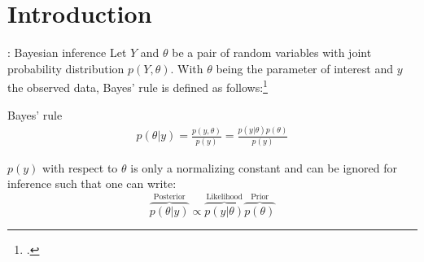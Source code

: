\section{Introduction}
\label{sec:intro}

\begin{frame}{: Bayesian inference}
    Let $Y$ and $\theta$ be a pair of random variables  with joint probability distribution $p(Y,\theta)$. With $\theta$ being the parameter of interest and $y$ the observed data, Bayes' rule is defined as follows:\footcite[pp.~6~f.]{gelman_bayesian_2013}

    \begin{block}{Bayes' rule}
        \begin{align}
            p(\theta|y) = \frac{p(y,\theta)}{p(y)} = \frac{p(y|\theta)p(\theta)}{p(y)}
        \end{align}
    \end{block}

    $p(y)$ with respect to $\theta$ is only a normalizing constant and can be ignored for inference such that one can write:
    \[\overbrace{p(\theta|y)}^\text{Posterior} \propto \overbrace{p(y|\theta)}^\text{Likelihood} \overbrace{p(\theta)}^\text{Prior}\]
\end{frame}


